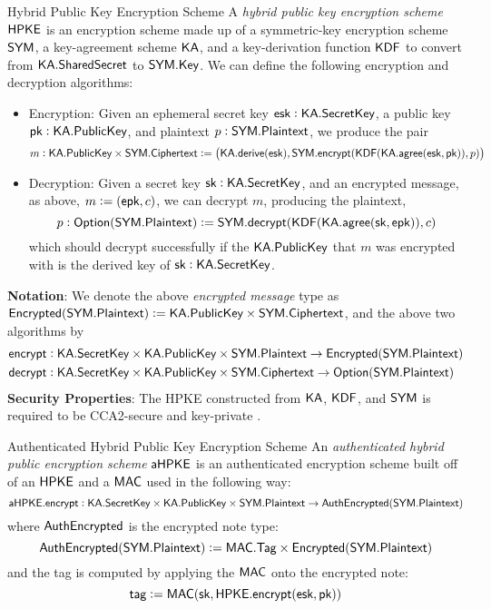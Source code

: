 \begin{definitiontoc}{Hybrid Public Key Encryption Scheme}
    A \emph{hybrid public key encryption scheme} \cite{irtf-cfrg-hpke-12} ${\textsf{HPKE}}$ is an encryption scheme made up of a symmetric-key encryption scheme ${\textsf{SYM}}$, a key-agreement scheme ${\textsf{KA}}$, and a key-derivation function ${\textsf{KDF}}$ to convert from ${\textsf{KA}}.{\textsf{SharedSecret}}$ to ${\textsf{SYM}}.{\textsf{Key}}$. We can define the following encryption and decryption algorithms:
    \begin{itemize}
        \item Encryption: Given an ephemeral secret key ${\textsf{esk}}: {\textsf{KA}}.{\textsf{SecretKey}}$, a public key ${\textsf{pk}}: {\textsf{KA}}.{\textsf{PublicKey}}$, and plaintext $p : {\textsf{SYM}}.{\textsf{Plaintext}}$, we produce the pair
            \[m : {\textsf{KA}}.{\textsf{PublicKey}} \times {\textsf{SYM}}.{\textsf{Ciphertext}} := \left({\textsf{KA}}.{\textsf{derive}}({\textsf{esk}}), {\textsf{SYM}}.{\textsf{encrypt}}({\textsf{KDF}}({\textsf{KA}}.{\textsf{agree}}({\textsf{esk}}, {\textsf{pk}})), p)\right)\]
        \item Decryption: Given a secret key ${\textsf{sk}} : {\textsf{KA}}.{\textsf{SecretKey}}$, and an encrypted message, as above, $m := ({\textsf{epk}}, c)$, we can decrypt $m$, producing the plaintext,
            \[p : {\textsf{Option}}({\textsf{SYM}}.{\textsf{Plaintext}}) := {\textsf{SYM}}.{\textsf{decrypt}}({\textsf{KDF}}({\textsf{KA}}.{\textsf{agree}}({\textsf{sk}}, {\textsf{epk}})), c)\]
            which should decrypt successfully if the ${\textsf{KA}}.{\textsf{PublicKey}}$ that $m$ was encrypted with is the derived key of ${\textsf{sk}} : {\textsf{KA}}.{\textsf{SecretKey}}$.
    \end{itemize}

    \textbf{Notation}: We denote the above \emph{encrypted message} type as ${\textsf{Encrypted}}({\textsf{SYM}}.{\textsf{Plaintext}}) := {\textsf{KA}}.{\textsf{PublicKey}} \times {\textsf{SYM}}.{\textsf{Ciphertext}}$, and the above two algorithms by
    \begin{align*}
        {\textsf{encrypt}} &: {\textsf{KA}}.{\textsf{SecretKey}} \times {\textsf{KA}}.{\textsf{PublicKey}} \times {\textsf{SYM}}.{\textsf{Plaintext}} \to {\textsf{Encrypted}}({\textsf{SYM}}.{\textsf{Plaintext}}) \\
        {\textsf{decrypt}} &: {\textsf{KA}}.{\textsf{SecretKey}} \times {\textsf{KA}}.{\textsf{PublicKey}} \times {\textsf{SYM}}.{\textsf{Ciphertext}} \to {\textsf{Option}}({\textsf{SYM}}.{\textsf{Plaintext}})
    \end{align*}
    \textbf{Security Properties}: The HPKE constructed from ${\textsf{KA}}$, ${\textsf{KDF}}$, and ${\textsf{SYM}}$ is required to be CCA2-secure and key-private \cite{BBDP01AC}. \\
\end{definitiontoc}

\begin{definitiontoc}{Authenticated Hybrid Public Key Encryption Scheme}
    An \emph{authenticated hybrid public encryption scheme} ${\textsf{aHPKE}}$ is an authenticated encryption scheme built off of an ${\textsf{HPKE}}$ and a ${\textsf{MAC}}$ used in the following way:
    \[{\textsf{aHPKE}}.{\textsf{encrypt}} : {\textsf{KA}}.{\textsf{SecretKey}} \times {\textsf{KA}}.{\textsf{PublicKey}} \times {\textsf{SYM}}.{\textsf{Plaintext}} \to {\textsf{AuthEncrypted}}({\textsf{SYM}}.{\textsf{Plaintext}})\]
    where ${\textsf{AuthEncrypted}}$ is the encrypted note type:
    \[{\textsf{AuthEncrypted}}({\textsf{SYM}}.{\textsf{Plaintext}}) := {\textsf{MAC}}.{\textsf{Tag}} \times {\textsf{Encrypted}}({\textsf{SYM}}.{\textsf{Plaintext}})\]
    and the tag is computed by applying the ${\textsf{MAC}}$ onto the encrypted note:
    \[{\textsf{tag}} := {\textsf{MAC}}({\textsf{sk}}, {\textsf{HPKE}}.{\textsf{encrypt}}({\textsf{esk}}, {\textsf{pk}}))\]
\end{definitiontoc}

